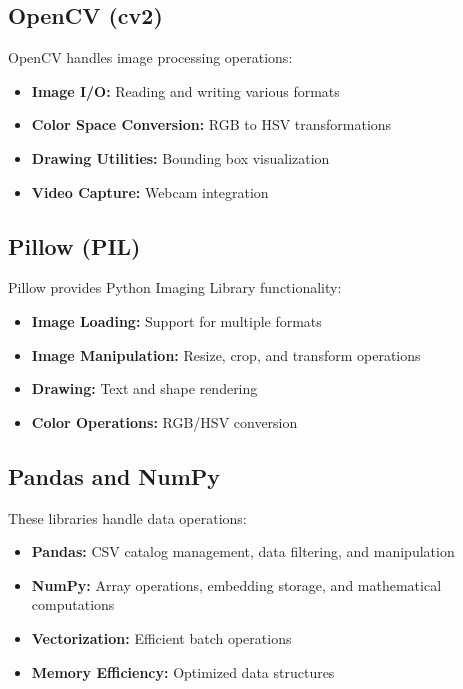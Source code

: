 \documentclass[12pt,a4paper]{report}
\begin{document}
\subsection{OpenCV (cv2)}

OpenCV handles image processing operations:

\begin{itemize}
    \item \textbf{Image I/O:} Reading and writing various formats
    \item \textbf{Color Space Conversion:} RGB to HSV transformations
    \item \textbf{Drawing Utilities:} Bounding box visualization
    \item \textbf{Video Capture:} Webcam integration
\end{itemize}

\subsection{Pillow (PIL)}

Pillow provides Python Imaging Library functionality:

\begin{itemize}
    \item \textbf{Image Loading:} Support for multiple formats
    \item \textbf{Image Manipulation:} Resize, crop, and transform operations
    \item \textbf{Drawing:} Text and shape rendering
    \item \textbf{Color Operations:} RGB/HSV conversion
\end{itemize}

\subsection{Pandas and NumPy}

These libraries handle data operations:

\begin{itemize}
    \item \textbf{Pandas:} CSV catalog management, data filtering, and manipulation
    \item \textbf{NumPy:} Array operations, embedding storage, and mathematical computations
    \item \textbf{Vectorization:} Efficient batch operations
    \item \textbf{Memory Efficiency:} Optimized data structures
\end{itemize}
\end{document}
